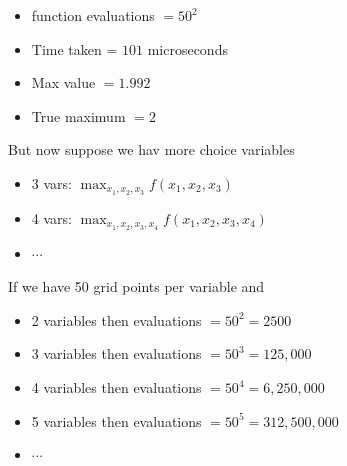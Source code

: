 \documentclass[
    xcolor={svgnames,dvipsnames},
    hyperref={colorlinks, citecolor=DeepPink4, linkcolor=DarkRed, urlcolor=DarkBlue}
    ]{beamer}  %
\newcommand{\1}{\mathbbm 1}
\begin{document}
\begin{frame}
    
    \begin{itemize}
        \item function evaluations $= 50^2$
    \vspace{0.5em}
        \item Time taken = $101$ microseconds
    \vspace{0.5em}
        \item Max value $= 1.992$
    \vspace{0.5em}
        \item True maximum $= 2$
    \end{itemize}

    \vspace{1em}


\end{frame}


\begin{frame}
    
    But now suppose we hav more choice variables

    \begin{itemize}
        \item 3 vars: $\max_{x_1, x_2, x_3} f(x_1, x_2, x_3)$
        \vspace{0.5em}
        \item 4 vars: $\max_{x_1, x_2, x_3, x_4} f(x_1, x_2, x_3, x_4)$
        \vspace{0.5em}
        \item $\cdots$
    \end{itemize}


\end{frame}

\begin{frame}
    

    If we have 50 grid points per variable and 
    
    \begin{itemize}
        \item 2 variables then evaluations $=50^2 = 2500$
        \vspace{0.5em}
        \item 3 variables then evaluations $=50^3 = 125,000$
        \vspace{0.5em}
        \item 4 variables then evaluations $=50^4 = 6,250,000$
        \vspace{0.5em}
        \item 5 variables then evaluations $=50^5 = 312,500,000$
        \vspace{0.5em}
        \item $\cdots$
    \end{itemize}

\end{frame}
\end{document}
